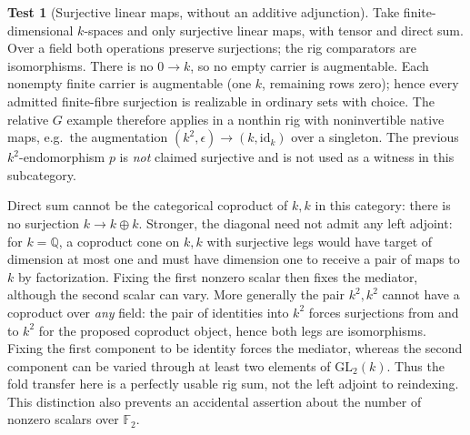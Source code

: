 \documentclass[11pt]{article}
\theoremstyle{definition}
\newtheorem{example}[theorem]{Test}
\newcommand{\id}{\mathrm{id}}
\begin{document}
\begin{example}[Surjective linear maps, without an additive adjunction]
Take finite-dimensional $k$-spaces and only surjective linear maps,
with tensor and direct sum. Over a field both operations preserve
surjections; the rig comparators are isomorphisms. There is no
$0\to k$, so no empty carrier is augmentable. Each nonempty finite
carrier is augmentable (one $k$, remaining rows zero); hence every
admitted finite-fibre surjection is realizable in ordinary sets with
choice. The relative $G$ example therefore applies in a nonthin rig
with noninvertible native maps, e.g.\ the augmentation
$(k^2,\epsilon)\to(k,\id_k)$ over a singleton. The previous
$k^2$-endomorphism $p$ is \emph{not} claimed surjective and is not used
as a witness in this subcategory.

Direct sum cannot be the categorical coproduct of $k,k$ in this
category: there is no surjection $k\to k\oplus k$. Stronger, the
diagonal need not admit any left adjoint: for $k=\mathbb Q$, a
coproduct cone on $k,k$ with surjective legs would have target of
dimension at most one and must have dimension one to receive a
pair of maps to $k$ by factorization. Fixing the first nonzero scalar
then fixes the mediator, although the second scalar can vary. More
generally the pair $k^2,k^2$ cannot have a coproduct over \emph{any}
field: the pair of identities into $k^2$ forces surjections from and
to $k^2$ for the proposed coproduct object, hence both legs are
isomorphisms. Fixing the first component to be identity forces the
mediator, whereas the second component can be varied through at least
two elements of $\mathrm{GL}_2(k)$. Thus the fold transfer here is a
perfectly usable rig sum, not the left adjoint to reindexing. This
distinction also prevents an accidental assertion about the number of
nonzero scalars over $\mathbb F_2$.
\end{example}
\end{document}
